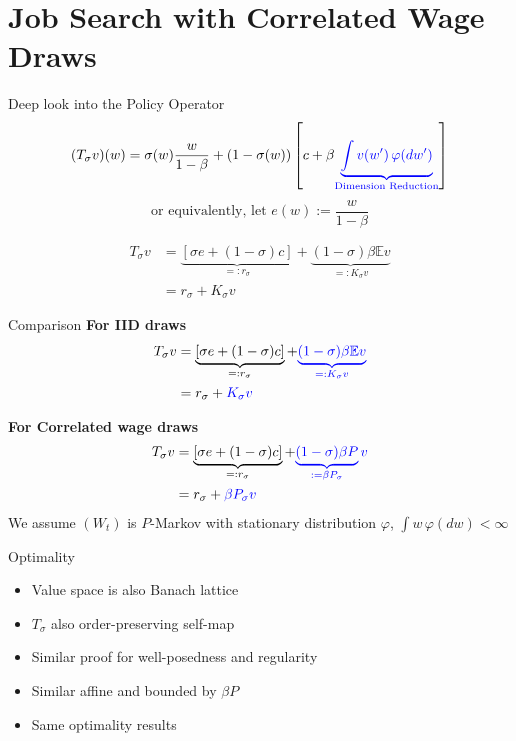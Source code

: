 \section{Job Search with Correlated Wage Draws}
\begin{frame}{Deep look into the Policy Operator}
        $$
(T_\sigma v)(w) = \sigma(w) \frac{w}{1-\beta} + (1-\sigma(w))\left[c+\beta\textcolor{blue}{\underbrace{\int v(w')\, \varphi(dw')}_{\text{Dimension Reduction}}}\right]
$$
$$
\text{or equivalently, let $e(w):=\frac{w}{1-\beta}$}
$$

\begin{align*}
    T_\sigma v &= \underbrace{[\sigma e+(1-\sigma)c]}_{=:r_\sigma} + \underbrace{(1-\sigma)\beta \mathbb{E}v}_{=:K_\sigma v}\\
    &= r_\sigma + K_\sigma v
\end{align*}
\end{frame}

\begin{frame}{Comparison}
\textbf{For IID draws}
\begin{align*}
    T_\sigma v &= \underbrace{[\sigma e+(1-\sigma)c]}_{=:r_\sigma} + \textcolor{blue}{\underbrace{(1-\sigma)\beta \mathbb{E}v}_{=:K_\sigma v}}\\
    &= r_\sigma + \textcolor{blue}{K_\sigma v}
\end{align*}

\textbf{For Correlated wage draws}
\begin{align*}
    T_\sigma v &= \underbrace{[\sigma e+(1-\sigma)c]}_{=:r_\sigma} + \textcolor{blue}{\underbrace{(1-\sigma)\beta P}_{:=\beta P_\sigma}v}\\
    &= r_\sigma +\textcolor{blue}{\beta P_\sigma v}
\end{align*}
We assume $(W_t)$ is $P$-Markov with stationary distribution $\varphi$, $\int w\,\varphi(dw)<\infty$
\end{frame}

\begin{frame}{Optimality}
\begin{itemize}
    \item Value space is also Banach lattice
    \item $T_\sigma$ also order-preserving self-map
    \item Similar proof for well-posedness and regularity
    \item Similar affine and bounded by $\beta P$
    \item Same optimality results
\end{itemize}
    
\end{frame}

